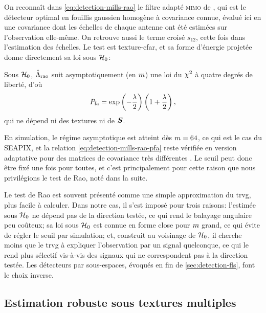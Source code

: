 On reconnaît dans \cref{eq:detection-mills-rao} le filtre adapté \textsc{mimo} de , qui est le détecteur optimal en fouillis gaussien homogène à covariance connue, évalué ici en une covariance dont les échelles de chaque antenne ont été estimées sur l'observation elle-même. On retrouve aussi le terme croisé $s_{12}$, cette fois dans l'estimation des échelles. Le test est texture-cfar, et sa forme d'énergie projetée donne directement sa loi sous $\mathcal{H}_0$:

\begin{proposition}
\label{prop:detection-mills-rao-pfa}
  Sous $\mathcal{H}_0$, $\hat{\Lambda}_{\mathrm{rao}}$ suit asymptotiquement (en $m$) une loi du $\chi^2$ à quatre degrés de liberté, d'où
  \begin{equation}
    P_{\mathrm{fa}} = \exp\left(-\frac{\lambda}{2}\right)\left(1+\frac{\lambda}{2}\right),
    \label{eq:detection-mills-rao-pfa}
  \end{equation}
  qui ne dépend ni des textures ni de $\boldsymbol{S}$.
\end{proposition}

En simulation, le régime asymptotique est atteint dès $m=64$, ce qui est le cas du SEAPIX, et la relation \cref{eq:detection-mills-rao-pfa} reste vérifiée en version adaptative pour des matrices de covariance très différentes \cite{JOE24}. Le seuil peut donc être fixé une fois pour toutes, et c'est principalement pour cette raison que nous privilégions le test de Rao, noté  dans la suite.

\begin{remark}
\label{rem:detection-pourquoi-rao}
  Le test de Rao est souvent présenté comme une simple approximation du trvg, plus facile à calculer. Dans notre cas, il s'est imposé pour trois raisons: l'estimée sous $\mathcal{H}_0$ ne dépend pas de la direction testée, ce qui rend le balayage angulaire peu coûteux; sa loi sous $\mathcal{H}_0$ est connue en forme close pour $m$ grand, ce qui évite de régler le seuil par simulation; et, construit au voisinage de $\mathcal{H}_0$, il cherche moins que le trvg à expliquer l'observation par un signal quelconque, ce qui le rend plus sélectif vis-à-vis des signaux qui ne correspondent pas à la direction testée. Les détecteurs par sous-espaces, évoqués en fin de \cref{sec:detection-fls}, font le choix inverse.
\end{remark}

\subsection{Estimation robuste sous textures multiples}
\label{subsec:detection-mills-estimation}

